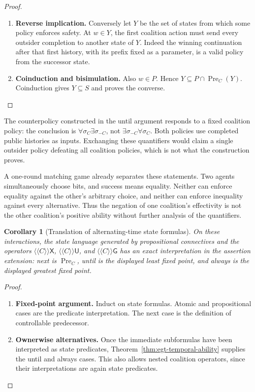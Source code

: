 \documentclass[11pt,a4paper]{article}
\numberwithin{equation}{section}
\newtheorem{corollary}[theorem]{Corollary}
\theoremstyle{definition}
\theoremstyle{remark}
\theoremstyle{plain}
\begin{document}
\begin{proof}
\begin{enumerate}[label=\textup{(\arabic*)},leftmargin=*,itemsep=4pt,topsep=3pt]
  \item \textbf{Reverse implication.} Conversely let $Y$ be the set of states from which
some policy enforces safety. At $w\in Y$, the first coalition action
must send every outsider completion to another state of $Y$. Indeed the winning continuation after that first history, with its
prefix fixed as a parameter, is a valid policy from the successor
state.
  \item \textbf{Coinduction and bisimulation.} Also $w\in P$. Hence
$Y\subseteq P\cap\operatorname{Pre}_C(Y)$. Coinduction gives
$Y\subseteq S$ and proves the converse.
\end{enumerate}
\end{proof}


The counterpolicy constructed in the until argument responds to
a fixed coalition policy: the conclusion is
$\forall\sigma_C\exists\sigma_{-C}$, not
$\exists\sigma_{-C}\forall\sigma_C$.
Both policies use completed public histories as inputs. Exchanging
these quantifiers would claim a single outsider policy defeating all
coalition policies, which is not what the construction proves.

A one-round matching game already separates these statements.
Two agents simultaneously choose bits, and success means equality.
Neither can enforce equality against the other's arbitrary choice,
and neither can enforce inequality against every alternative. Thus the
negation of one coalition's effectivity is not the other coalition's
positive ability without further analysis of the quantifiers.

\begin{corollary}[Translation of alternating-time state formulas]
\label{cor:egt-atl}
On these interactions, the state language generated by propositional connectives and the operators
$\langle\!\langle C\rangle\!\rangle\mathsf X$,
$\langle\!\langle C\rangle\!\rangle\mathsf U$, and
$\langle\!\langle C\rangle\!\rangle\mathsf G$
has an exact interpretation in the assertion extension:
next is $\operatorname{Pre}_C$, until is the displayed least fixed
point, and always is the displayed greatest fixed point.
\end{corollary}
\begin{proof}
\leavevmode
\begin{enumerate}[label=\textup{(\arabic*)},leftmargin=*,itemsep=4pt,topsep=3pt]
  \item \textbf{Fixed-point argument.} Induct on state formulas. Atomic and propositional cases are the
predicate interpretation. The next case is the definition of controllable
predecessor.
  \item \textbf{Ownerwise alternatives.} Once the immediate subformulas have been interpreted as
state predicates, Theorem~\ref{thm:egt-temporal-ability} supplies the
until and always cases. This also allows nested coalition operators,
since their interpretations are again state predicates.
\end{enumerate}
\end{proof}
\end{document}
